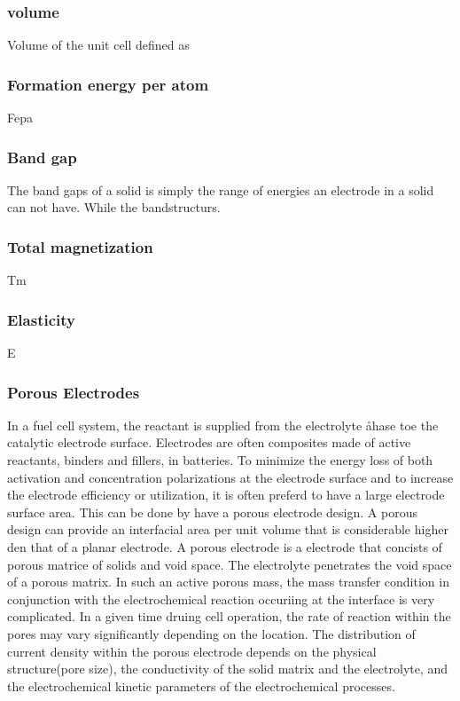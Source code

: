 	\subsubsection*{volume}
	Volume of the unit cell defined as 	
	\subsubsection*{Formation energy per atom}
	Fepa
	\subsubsection*{Band gap}
	The band gaps of a solid is simply the range of energies an electrode in a solid can not have. While the bandstructurs.
	
	\subsubsection*{Total magnetization}
	Tm
	\subsubsection*{Elasticity}
	E
	\subsubsection*{Porous Electrodes}
	In a fuel cell system, the reactant is supplied from the electrolyte åhase toe the catalytic electrode surface. Electrodes are often composites made of active reactants, binders and fillers, in batteries. To minimize the energy loss of both activation and concentration polarizations at the electrode surface and to increase the electrode efficiency or utilization, it is often preferd to have a large electrode surface area. This can be done by have a porous electrode design. A porous design can provide an interfacial area per unit volume that is considerable higher den that of a planar electrode. 
	A porous electrode is a electrode that concists of porous matrice of solids and void space. The electrolyte penetrates the void space of a porous matrix. In such an active porous mass, the mass transfer condition in conjunction with the electrochemical reaction occuriing at the interface is very complicated. In a given time druing cell operation, the rate of reaction within the pores may vary significantly depending on the location. The distribution of current density within the porous electrode depends on the physical structure(pore size), the conductivity of the solid matrix and the electrolyte, and the electrochemical kinetic parameters of the electrochemical processes.  
	
